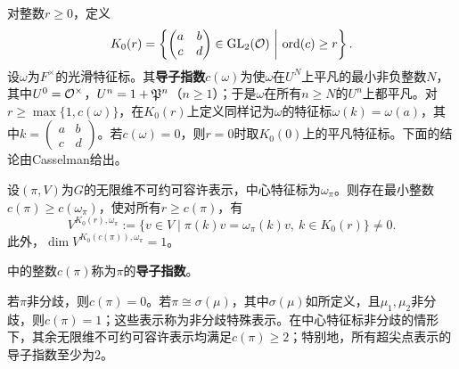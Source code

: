对整数$r\geq0$，定义
\[K_0(r)=\left\{\begin{pmatrix}a&b\\c&d\end{pmatrix}\in\GL_2(\OO)\ \middle|\ \ord(c)\geq r\right\}.\]
设$\omega$为$F^\times$的光滑特征标。其\textbf{导子指数}$c(\omega)$为使$\omega$在$U^N$上平凡的最小非负整数$N$，其中$U^0=\mathcal O^\times$，$U^n=1+\mathfrak{P}^n$（$n\geq1$）；于是$\omega$在所有$n\geq N$的$U^n$上都平凡。对$r\geq\max\{1,c(\omega)\}$，在$K_0(r)$上定义同样记为$\omega$的特征标$\omega(k)=\omega(a)$，其中$k=\begin{pmatrix}a&b\\c&d\end{pmatrix}$。若$c(\omega)=0$，则$r=0$时取$K_0(0)$上的平凡特征标。下面的结论由Casselman给出。
\begin{theorem}\label{L5S3O6}
设$(\pi,V)$为$G$的无限维不可约可容许表示，中心特征标为$\omega_\pi$。则存在最小整数$c(\pi)\geq c(\omega_\pi)$，使对所有$r\geq c(\pi)$，有
\[V^{K_0(r),\omega_\pi}:=\{v\in V\mid\pi(k)v=\omega_\pi(k)v,\ k\in K_0(r)\}\ne0.\]
此外，$\dim V^{K_0(c(\pi)),\omega_\pi}=1$。
\end{theorem}
中的整数$c(\pi)$称为$\pi$的\textbf{导子指数}。
\begin{note}[L5S3O7]
若$\pi$非分歧，则$c(\pi)=0$。若$\pi\cong\sigma(\mu)$，其中$\sigma(\mu)$如所定义，且$\mu_1,\mu_2$非分歧，则$c(\pi)=1$；这些表示称为非分歧特殊表示。在中心特征标非分歧的情形下，其余无限维不可约可容许表示均满足$c(\pi)\geq2$；特别地，所有超尖点表示的导子指数至少为$2$。
\end{note}
